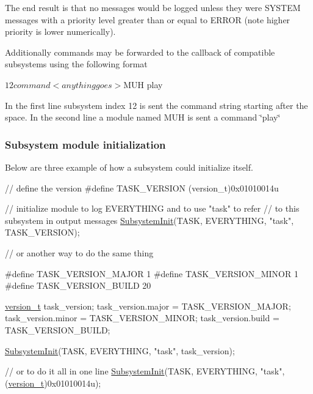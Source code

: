 The end result is that no messages would be logged unless they were S\+Y\+S\+T\+E\+M messages with a priority level greater than or equal to E\+R\+R\+O\+R (note higher priority is lower numerically).

Additionally commands may be forwarded to the callback of compatible subsystems using the following format 
\begin{DoxyCode}
$12 command <anything goes>
$MUH play
\end{DoxyCode}
 In the first line subsystem index 12 is sent the command string starting after the space. In the second line a module named M\+U\+H is sent a command \char`\"{}play\char`\"{} \hypertarget{subsys_init}{}\subsubsection{Subsystem module initialization}\label{subsys_init}
Below are three example of how a subsystem could initialize itself.


\begin{DoxyCode}
\textcolor{comment}{// define the version}
\textcolor{preprocessor}{#define TASK\_VERSION (version\_t)0x01010014u}

\textcolor{comment}{// initialize module to log EVERYTHING and to use "task" to refer}
\textcolor{comment}{// to this subsystem in output messages}
\hyperlink{group__subsys_ga4cb5a7bc96bce54eaedba65a8f4847b5}{SubsystemInit}(TASK, EVERYTHING, \textcolor{stringliteral}{"task"}, TASK\_VERSION);

\textcolor{comment}{// or another way to do the same thing}

\textcolor{preprocessor}{#define TASK\_VERSION\_MAJOR 1}
\textcolor{preprocessor}{#define TASK\_VERSION\_MINOR 1}
\textcolor{preprocessor}{#define TASK\_VERSION\_BUILD 20}

\hyperlink{unionversion__t}{version\_t} task\_version;
task\_version.major = TASK\_VERSION\_MAJOR;
task\_version.minor = TASK\_VERSION\_MINOR;
task\_version.build = TASK\_VERSION\_BUILD;

\hyperlink{group__subsys_ga4cb5a7bc96bce54eaedba65a8f4847b5}{SubsystemInit}(TASK, EVERYTHING, \textcolor{stringliteral}{"task"}, task\_version);

\textcolor{comment}{// or to do it all in one line}
\hyperlink{group__subsys_ga4cb5a7bc96bce54eaedba65a8f4847b5}{SubsystemInit}(TASK, EVERYTHING, \textcolor{stringliteral}{"task"}, (\hyperlink{unionversion__t}{version\_t})0x01010014u);
\end{DoxyCode}
 

